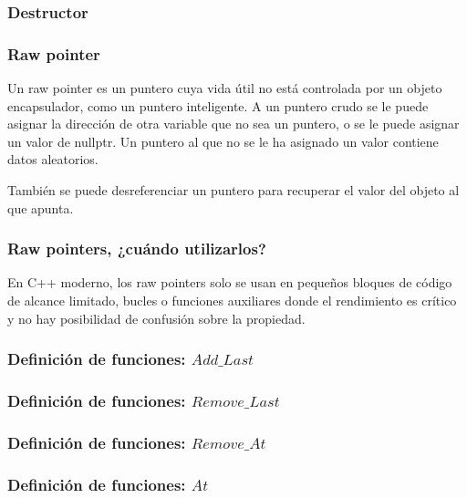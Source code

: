\documentclass{beamer}
\begin{document}
	\begin{frame}
		\frametitle{Destructor}
		
	\end{frame}

	\begin{frame}
		\frametitle{Raw pointer}
		Un raw pointer es un puntero cuya vida útil no está controlada por un objeto encapsulador, como un puntero inteligente. A un puntero crudo se le puede asignar la dirección de otra variable que no sea un puntero, o se le puede asignar un valor de nullptr. Un puntero al que no se le ha asignado un valor contiene datos aleatorios.
		
		También se puede desreferenciar un puntero para recuperar el valor del objeto al que apunta.
	\end{frame}

	\begin{frame}
		\frametitle{Raw pointers, ¿cu\'ando utilizarlos?}
		En C++ moderno, los raw pointers solo se usan en pequeños bloques de código de alcance limitado, bucles o funciones auxiliares donde el rendimiento es crítico y no hay posibilidad de confusión sobre la propiedad.
	\end{frame}

	\begin{frame}
		\frametitle{Definici\'on de funciones: $ Add\_Last $}
		
	\end{frame}

	\begin{frame}
		\frametitle{Definici\'on de funciones: $ Remove\_Last $}
		
	\end{frame}

	\begin{frame}
		\frametitle{Definici\'on de funciones: $ Remove\_At $}
		
	\end{frame}

	\begin{frame}
		\frametitle{Definici\'on de funciones: $ At $}
		
	\end{frame}
\end{document}
